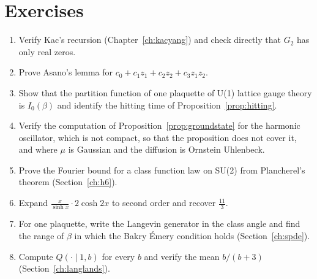 \section*{Exercises}
\begin{enumerate}
\item Verify Kac's recursion (Chapter~\ref{ch:kacyang}) and check directly that $G_2$ has only real zeros.
\item Prove Asano's lemma for $c_0+c_1z_1+c_2z_2+c_3z_1z_2$.
\item Show that the partition function of one plaquette of U(1) lattice gauge theory is $I_0(\beta)$ and identify the hitting time of Proposition~\ref{prop:hitting}.
\item Verify the computation of Proposition~\ref{prop:groundstate} for the harmonic oscillator, which is not compact, so that the proposition does not cover it, and where $\mu$ is Gaussian and the diffusion is Ornstein Uhlenbeck.
\item Prove the Fourier bound for a class function law on SU(2) from Plancherel's theorem (Section~\ref{ch:h6}).
\item Expand $\frac{x}{\sinh x}\cdot2\cosh2x$ to second order and recover $\frac{11}{3}$.
\item For one plaquette, write the Langevin generator in the class angle and find the range of $\beta$ in which the Bakry \'Emery condition holds (Section~\ref{ch:spde}).
\item Compute $Q(\cdot\mid1,b)$ for every $b$ and verify the mean $b/(b+3)$ (Section~\ref{ch:langlands}).
\end{enumerate}

